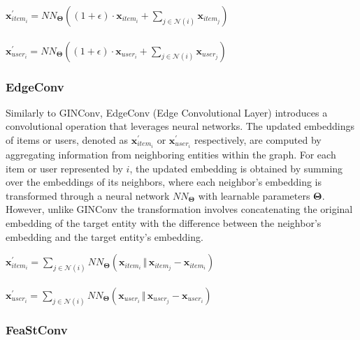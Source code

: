\documentclass{scrartcl}
\begin{document}
\begin{center}
    $\mathbf{x}^{\prime}_{item_{i}} = NN_{\mathbf{\Theta}} \left( (1 + \epsilon) \cdot \mathbf{x}_{item_{i}} + \sum_{j \in \mathcal{N}(i)} \mathbf{x}_{item_{j}} \right)$ \\~\\
    $\mathbf{x}^{\prime}_{user_{i}} = NN_{\mathbf{\Theta}} \left( (1 + \epsilon) \cdot \mathbf{x}_{user_{i}} + \sum_{j \in \mathcal{N}(i)} \mathbf{x}_{user_{j}} \right)$
\end{center}

\subsubsection{EdgeConv\cite{edgeconv}} 

\quad Similarly to GINConv, EdgeConv (Edge Convolutional Layer) introduces a convolutional operation that leverages neural networks. The updated embeddings of items or users, denoted as $\mathbf{x}^{\prime}_{item_i}$ or $\mathbf{x}^{\prime}_{user_i}$ respectively, are computed by aggregating information from neighboring entities within the graph. For each item or user represented by $i$, the updated embedding is obtained by summing over the embeddings of its neighbors, where each neighbor's embedding is transformed through a neural network $NN_{\mathbf{\Theta}}$ with learnable parameters $\mathbf{\Theta}$. However, unlike GINConv the transformation involves concatenating the original embedding of the target entity with the difference between the neighbor's embedding and the target entity's embedding. \\ 

\begin{center}
    $\mathbf{x}^{\prime}_{item_{i}} = \sum_{j \in \mathcal{N}(i)} NN_{\mathbf{\Theta}}(\mathbf{x}_{item_{i}} \, \Vert \, \mathbf{x}_{item_{j}} - \mathbf{x}_{item_{i}})$ \\~\\
    $\mathbf{x}^{\prime}_{user_{i}} = \sum_{j \in \mathcal{N}(i)} NN_{\mathbf{\Theta}}(\mathbf{x}_{user_{i}} \, \Vert \, \mathbf{x}_{user_{j}} - \mathbf{x}_{user_{i}})$
\end{center}


\subsubsection{FeaStConv\cite{feastconv}} 
\end{document}
